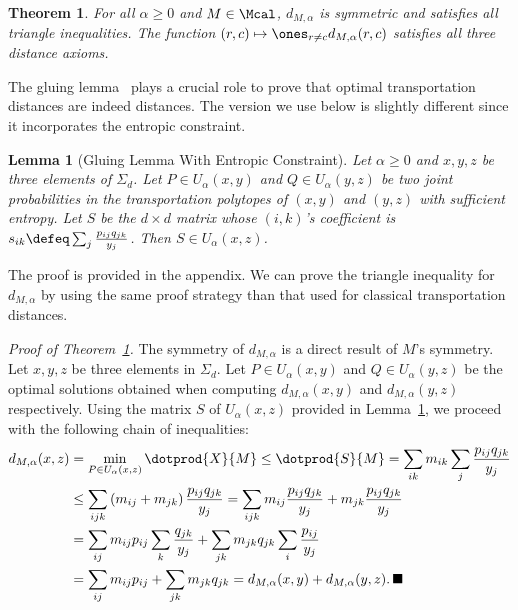 \documentclass{amsart} %
\newtheorem{theorem}{Theorem}
\newtheorem{lemma}{Lemma}
\begin{document}
\begin{theorem}\label{theo:metric} For all $\alpha\geq 0$ and $M\in\Mcal$, $d_{M,\alpha}$ is symmetric and satisfies all triangle inequalities. The function $(r,c)\mapsto \ones_{r\ne c} d_{M,\alpha}(r,c)$ satisfies all three distance axioms. 
\end{theorem}
The gluing lemma~\cite[Lemma 7.6]{villani} plays a crucial role to prove that optimal transportation distances are indeed distances. The version we use below is slightly different since it incorporates the entropic constraint.
\begin{lemma}[Gluing Lemma With Entropic Constraint]\label{lem:gluing} Let $\alpha\geq 0$ and $x,y,z$ be three elements of $\Sigma_d$. Let $P\in U_\alpha(x,y)$ and $Q\in U_\alpha(y,z)$ be two joint probabilities in the transportation polytopes of $(x,y)$ and $(y,z)$ with sufficient entropy. Let $S$ be the $d\times d$ matrix whose $(i,k)$'s coefficient is $s_{ik}\defeq \sum_{j} \frac{p_{ij}q_{jk}}{y_j}$. Then $S\in U_{\alpha}(x,z)$.
\end{lemma}
The proof is provided in the appendix. We can prove the triangle inequality for $d_{M,\alpha}$ by using the same proof strategy than that used for classical transportation distances.

\emph{Proof of Theorem~\ref{theo:metric}.} The symmetry of $d_{M,\alpha}$ is a direct result of $M$'s symmetry. Let $x,y,z$ be three elements in $\Sigma_d$. Let $P\in U_{\alpha}(x,y)$ and $Q\in U_{\alpha}(y,z)$ be the optimal solutions obtained when computing $d_{M,\alpha}(x,y)$ and $d_{M,\alpha}(y,z)$ respectively. Using the matrix $S$ of $U_{\alpha}(x,z)$ provided in Lemma~\ref{lem:gluing}, we proceed with the following chain of inequalities:
	$$\begin{aligned}
	d_{M,\alpha}(x,z)&=\min_{P\in U_\alpha(x,z)}\dotprod{X}{M} \leq \dotprod{S}{M} = \sum_{ik} m_{ik}\sum_{j} \frac{p_{ij}q_{jk}}{y_j} \\ & \leq \sum_{ijk} \left(m_{ij}+m_{jk}\right) \frac{p_{ij}q_{jk}}{y_j} = \sum_{ijk} m_{ij} \frac{p_{ij}q_{jk}}{y_j} +m_{jk} \frac{p_{ij}q_{jk}}{y_j}  \\
	& =\sum_{ij} m_{ij}p_{ij} \sum_k \frac{q_{jk}}{y_j} + \sum_{jk} m_{jk} q_{jk} \sum_i \frac{p_{ij}}{y_j}\\
	&= \sum_{ij} m_{ij}p_{ij} + \sum_{jk} m_{jk} q_{jk} = d_{M,\alpha}(x,y)+d_{M,\alpha}(y,z).\,\blacksquare\end{aligned}
	$$

\end{document}
